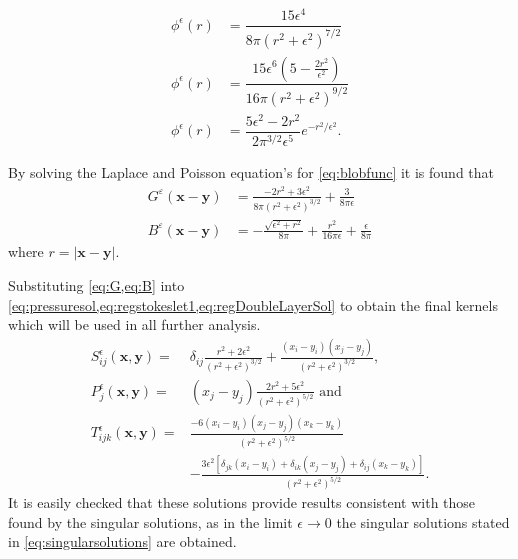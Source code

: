 \begin{align}
    \label{eq:blobfunc}\phi^\epsilon(r) &= \dfrac{15 \epsilon^4}{8\pi\left( r^2 +\epsilon^2 \right)^{7/2}} \\
    \label{eq:blobfunc2}\phi^{\epsilon}(r) &= \dfrac{15 \epsilon^{6}\left(5-\frac{2 r^{2}}{\epsilon^{2}}\right)}{16 \pi\left(r^{2}+\epsilon^{2}\right)^{9 / 2}}\\
    \label{eq:blobfunc3}\phi^{\epsilon}(r) &= \dfrac{5 \epsilon^{2}-2 r^{2}}{2 \pi^{3 / 2} \epsilon^{5}} e^{-r^{2} / \epsilon^{2}}.
\end{align}

By solving the Laplace and Poisson equation's for \cref{eq:blobfunc} it is found that
\begin{subequations}
\begin{align}
    G^\varepsilon(\bm{x}-\bm{y}) &= \frac{-2r^2+3\epsilon^2}{8\pi(r^2+\epsilon^2)^{3/2}} + \frac{3}{8\pi\epsilon} \label{eq:G}\\
    B^\varepsilon(\bm{x}-\bm{y}) &= -\frac{\sqrt{\epsilon^2+r^2}}{8\pi} + \frac{r^2}{16\pi\epsilon} + \frac{\epsilon}{8\pi}\label{eq:B}
\end{align}
\end{subequations}
where $r=|\bm{x}-\bm{y}|$. 

Substituting \cref{eq:G,eq:B} into \cref{eq:pressuresol,eq:regstokeslet1,eq:regDoubleLayerSol} to obtain the final kernels which will be used in all further analysis.
\begin{subequations}
\begin{align}
    S_{ij}^\epsilon(\bm{x}, \bm{y}) =& \delta_{ij} \frac{r^2+2\epsilon^2}{\left( r^2 + \epsilon^2 \right)^{3/2}} + \frac{(x_i-y_{i})(x_j-y_{j})}{\left( r^2 + \epsilon^2 \right)^{3/2}}, \label{eq:regstokeslet2} \\
    P_j^\epsilon(\bm{x}, \bm{y}) =& (x_j-y_{j})\frac{2r^2+5\epsilon^2}{(r^2+\epsilon^2)^{5/2}} \text{ and } \label{eq:pressuresol2} \\
    T_{ijk}^\epsilon(\bm{x}, \bm{y}) =& \frac{-6(x_i-y_{i})(x_j-y_{j})(x_k-y_{k})}{(r^2+\epsilon^2)^{5/2}} \label{eq:doublelayer2}\\
    &-\frac{3\epsilon^2[\delta_{jk}(x_i-y_{i}) +\delta_{ik}(x_j-y_{j})+\delta_{ij}(x_k-y_{k})]}{(r^2+\epsilon^2)^{5/2}}. \nonumber
\end{align}
\end{subequations}
It is easily checked that these solutions provide results consistent with those found by the singular solutions, as in the limit $\epsilon \to 0$  the singular solutions stated in \cref{eq:singularsolutions} are obtained.

